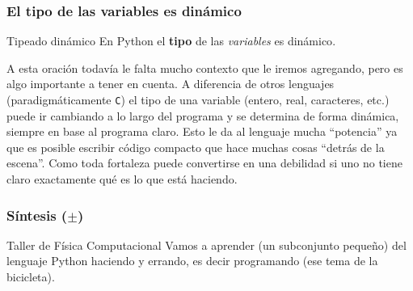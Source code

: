 \documentclass[aspectratio=169]{beamer}
\begin{document}

\begin{frame}
\frametitle{El tipo de las variables es dinámico}
\begin{block}{Tipeado dinámico}
En Python el {\bf tipo} de las {\em variables} es \alert{dinámico}. 
\end{block}
A esta oración todavía le falta mucho contexto que le iremos agregando, pero es algo importante a tener en cuenta. A diferencia de otros lenguajes (paradigmáticamente {\tt C}) el tipo de una variable (entero, real, caracteres, etc.) puede ir cambiando a lo largo del programa y se determina de forma dinámica, siempre en base al programa claro. Esto le da al lenguaje mucha ``potencia'' ya que es posible escribir código compacto que hace muchas cosas ``detrás de la escena''. Como toda fortaleza puede convertirse en una debilidad si uno no tiene claro exactamente qué es lo que está haciendo.
\end{frame}


\begin{frame}
\frametitle{Síntesis ($\pm$)}
\begin{block}{Taller de Física Computacional}
Vamos a aprender (un subconjunto pequeño) del lenguaje Python \alert{haciendo y errando}, es decir programando (ese tema de la bicicleta).
\end{block}

\end{frame}
\end{document}
